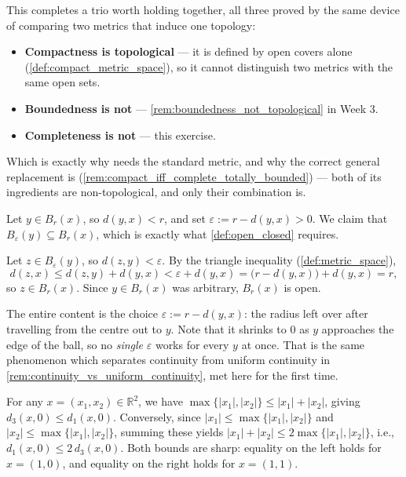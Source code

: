 \begin{exercisesolution}
\begin{remark}
This completes a trio worth holding together, all three proved by the same device of comparing
two metrics that induce one topology:
\begin{itemize}
  \item \textbf{Compactness is topological} --- it is defined by open covers alone
    (\cref{def:compact_metric_space}), so it cannot distinguish two metrics with the same open
    sets.
  \item \textbf{Boundedness is not} --- \cref{rem:boundedness_not_topological} in Week 3.
  \item \textbf{Completeness is not} --- this exercise.
\end{itemize}
Which is exactly why  needs the standard metric, and why
the correct general replacement is 
(\cref{rem:compact_iff_complete_totally_bounded}) --- both of its ingredients are
non-topological, and only their combination is.
\end{remark}
\end{exercisesolution}

\begin{exercisesolution}
Let $y \in B_r(x)$, so $d(y,x) < r$, and set $\varepsilon := r - d(y,x) > 0$. We claim that
$B_\varepsilon(y) \subseteq B_r(x)$, which is exactly what \cref{def:open_closed} requires.

Let $z \in B_\varepsilon(y)$, so $d(z,y) < \varepsilon$. By the triangle inequality
(\cref{def:metric_space}),
\[d(z,x) \leq d(z,y) + d(y,x) < \varepsilon + d(y,x) = \big(r-d(y,x)\big) + d(y,x) = r,\]
so $z \in B_r(x)$. Since $y \in B_r(x)$ was arbitrary, $B_r(x)$ is open.

\begin{remark}
The entire content is the choice $\varepsilon := r - d(y,x)$: the radius left over after
travelling from the centre out to $y$. Note that it shrinks to $0$ as $y$ approaches the edge of
the ball, so no \emph{single} $\varepsilon$ works for every $y$ at once. That is the same
 phenomenon which separates continuity from uniform
continuity in \cref{rem:continuity_vs_uniform_continuity}, met here for the first time.
\end{remark}
\end{exercisesolution}

\begin{exercisesolution}
For any $x = (x_1, x_2) \in \mathbb{R}^2$, we have $\max\{|x_1|, |x_2|\} \leq |x_1| + |x_2|$, giving $d_3(x,0) \leq d_1(x,0)$. Conversely, since $|x_1| \leq \max\{|x_1|, |x_2|\}$ and $|x_2| \leq \max\{|x_1|, |x_2|\}$, summing these yields $|x_1| + |x_2| \leq 2 \max\{|x_1|, |x_2|\}$, i.e., $d_1(x,0) \leq 2 \, d_3(x,0)$. Both bounds are sharp: equality on the left holds for $x=(1,0)$, and equality on the right holds for $x=(1,1)$.
\end{exercisesolution}

